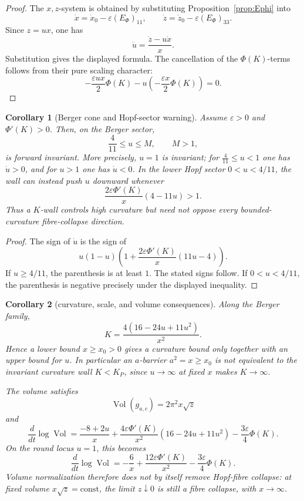 \documentclass[11pt]{amsart}
\newtheorem{corollary}{Corollary}
\newcommand{\KP}{K_{\!P}}
\newcommand{\Vol}{\operatorname{Vol}}
\begin{document}
\begin{proof}
The \(x,z\)-system is obtained by substituting Proposition~\ref{prop:Ephi} into
\[
        \dot x=\dot x_0-\varepsilon(E_\Phi)_{11},\qquad
        \dot z=\dot z_0-\varepsilon(E_\Phi)_{33}.
\]
Since \(z=ux\), one has
\[
        \dot u=\frac{\dot z-u\dot x}{x}.
\]
Substitution gives the displayed formula.  The cancellation of the
\(\Phi(K)\)-terms follows from their pure scaling character:
\[
        -\frac{\varepsilon ux}{2}\Phi(K)
        -
        u\left(-\frac{\varepsilon x}{2}\Phi(K)\right)=0 .
\]
\end{proof}

\begin{corollary}[Berger cone and Hopf-sector warning]\label{cor:berger-cone}
Assume \(\varepsilon>0\) and \(\Phi'(K)>0\).  Then, on the Berger sector,
\[
        \frac4{11}\le u\le M,\qquad M>1,
\]
is forward invariant.  More precisely, \(u=1\) is invariant; for
\(\frac4{11}\le u<1\) one has \(\dot u>0\), and for \(u>1\) one has
\(\dot u<0\).  In the lower Hopf sector \(0<u<4/11\), the wall can instead
push \(u\) downward whenever
\[
\boxed{
        \frac{2\varepsilon\Phi'(K)}{x}(4-11u)>1 .
}
\]
Thus a \(K\)-wall controls high curvature but need not oppose every
bounded-curvature fibre-collapse direction.
\end{corollary}

\begin{proof}
The sign of \(\dot u\) is the sign of
\[
        u(1-u)
        \left(
        1+\frac{2\varepsilon\Phi'(K)}{x}(11u-4)
        \right).
\]
If \(u\ge4/11\), the parenthesis is at least \(1\).  The stated signs follow.
If \(0<u<4/11\), the parenthesis is negative precisely under the displayed
inequality.
\end{proof}

\begin{corollary}[curvature, scale, and volume consequences]\label{cor:berger-scale-volume}
Along the Berger family,
\[
        K=\frac{4(16-24u+11u^2)}{x^2}.
\]
Hence a lower bound \(x\ge x_0>0\) gives a curvature bound only together with
an upper bound for \(u\).  In particular an \(a\)-barrier \(a^2=x\ge x_0\) is
not equivalent to the invariant curvature wall \(K<\KP\), since \(u\to\infty\)
at fixed \(x\) makes \(K\to\infty\).

The volume satisfies
\[
        \Vol(g_{a,c})=2\pi^2x\sqrt z
\]
and
\[
\boxed{
        \frac{d}{dt}\log\Vol
        =
        \frac{-8+2u}{x}
        +
        \frac{4\varepsilon\Phi'(K)}{x^2}(16-24u+11u^2)
        -
        \frac{3\varepsilon}{4}\Phi(K).
}
\]
On the round locus \(u=1\), this becomes
\[
\boxed{
        \frac{d}{dt}\log\Vol
        =
        -\frac6x
        +
        \frac{12\varepsilon\Phi'(K)}{x^2}
        -
        \frac{3\varepsilon}{4}\Phi(K).
}
\]
Volume normalization therefore does not by itself remove Hopf-fibre collapse:
at fixed volume \(x\sqrt z=\mathrm{const}\), the limit \(z\downarrow0\) is still
a fibre collapse, with \(x\to\infty\).
\end{corollary}
\end{document}

